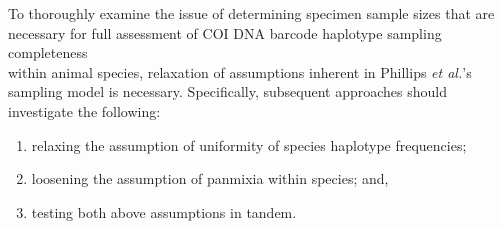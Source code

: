 To thoroughly examine the issue of determining specimen sample sizes that are \\ necessary for full assessment of COI DNA barcode haplotype sampling completeness \\ within animal species, relaxation of assumptions inherent in Phillips \textit{et al.}'s \cite{phillips2015exploration} sampling model is necessary. Specifically, subsequent approaches should investigate the following:

\begin{enumerate}

\item relaxing the assumption of uniformity of species haplotype frequencies;

\vspace{1mm}

\item loosening the assumption of panmixia within species; and,

\vspace{1mm}

\item testing both above assumptions in tandem.

\end{enumerate}

